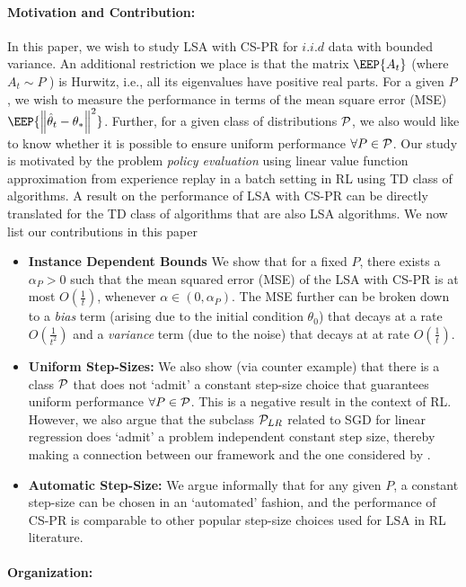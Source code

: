 \paragraph{Motivation and Contribution:} In this paper, we wish to study LSA with CS-PR for $i.i.d$ data with bounded variance. An additional restriction we place is that the matrix $\EEP{A_t}$ (where $A_t\sim P$ ) is Hurwitz, i.e., all its eigenvalues have positive real parts. For a given $P$, we wish to measure the performance in terms of the mean square error (MSE) $\EEP{\norm{\thh_t-\ts}^2}$. Further, for a given class of distributions $\P$, we also would like to know whether it is possible to ensure uniform performance $\forall P\in \P$.
Our study is motivated by the problem \emph{policy evaluation} \cite{dann} using linear value function approximation from experience replay \cite{lin} in a batch setting \cite{lange} in RL using TD class \cite{sutton,konda-tsitsiklis,gtd,gtd2,gtdmp} of algorithms. A result on the performance of LSA with CS-PR can be directly translated for the TD class of algorithms that are also LSA algorithms.
We now list our contributions in this paper
\begin{itemize}[leftmargin=*]%
\item \textbf{Instance Dependent Bounds} We show that for a fixed $P$, there exists a $\alpha_P>0$ such that the mean squared error (MSE) of the LSA with CS-PR is at most $O(\frac{1}{t})$, whenever $\alpha\in (0,\alpha_P)$. The MSE further can be broken down to a \emph{bias} term (arising due to the initial condition $\theta_0$) that decays at a rate $O(\frac{1}{t^2})$ and a \emph{variance} term (due to the noise) that decays at at rate $O(\frac{1}{t})$.
\item \textbf{Uniform Step-Sizes:} We also show (via counter example) that there is a class $\P$ that does not `admit' a constant step-size choice that guarantees uniform performance $\forall P\in \P$. This is a negative result in the context of RL. However,
we also argue that the subclass $\P_{LR}$ related to SGD for linear regression does `admit' a problem independent constant step size, thereby making a connection between our framework and the one considered by \cite{bach}.
\item \textbf{Automatic Step-Size:} We argue informally that for any given $P$, a constant step-size can be chosen in an `automated' fashion, and the performance of CS-PR is comparable to other popular step-size choices used for LSA in RL literature.
\end{itemize}
\paragraph{Organization:}
